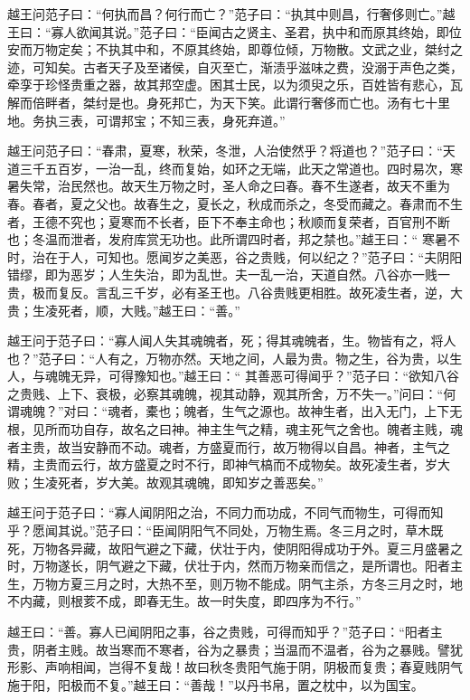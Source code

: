 \documentclass[12pt,UTF8]{ctexbook}
\begin{document}
越王问范子曰：“何执而昌？何行而亡？”范子曰：“执其中则昌，行奢侈则亡。”越王曰：“寡人欲闻其说。”范子曰：“臣闻古之贤主、圣君，执中和而原其终始，即位安而万物定矣；不执其中和，不原其终始，即尊位倾，万物散。文武之业，桀纣之迹，可知矣。古者天子及至诸侯，自灭至亡，渐渍乎滋味之费，没溺于声色之类，牵孪于珍怪贵重之器，故其邦空虚。困其士民，以为须臾之乐，百姓皆有悲心，瓦解而倍畔者，桀纣是也。身死邦亡，为天下笑。此谓行奢侈而亡也。汤有七十里地。务执三表，可谓邦宝；不知三表，身死弃道。”

越王问范子曰：“春肃，夏寒，秋荣，冬泄，人治使然乎？将道也？”范子曰：“天道三千五百岁，一治一乱，终而复始，如环之无端，此天之常道也。四时易次，寒暑失常，治民然也。故天生万物之时，圣人命之曰春。春不生遂者，故天不重为春。春者，夏之父也。故春生之，夏长之，秋成而杀之，冬受而藏之。春肃而不生者，王德不究也；夏寒而不长者，臣下不奉主命也；秋顺而复荣者，百官刑不断也；冬温而泄者，发府库赏无功也。此所谓四时者，邦之禁也。”越王曰：“ 寒暑不时，治在于人，可知也。愿闻岁之美恶，谷之贵贱，何以纪之？”范子曰：“夫阴阳错缪，即为恶岁；人生失治，即为乱世。夫一乱一治，天道自然。八谷亦一贱一贵，极而复反。言乱三千岁，必有圣王也。八谷贵贱更相胜。故死凌生者，逆，大贵；生凌死者，顺，大贱。”越王曰：“善。”

越王问于范子曰：“寡人闻人失其魂魄者，死；得其魂魄者，生。物皆有之，将人也？”范子曰：“人有之，万物亦然。天地之间，人最为贵。物之生，谷为贵，以生人，与魂魄无异，可得豫知也。”越王曰：“ 其善恶可得闻乎？”范子曰：“欲知八谷之贵贱、上下、衰极，必察其魂魄，视其动静，观其所舍，万不失一。”问曰：“何谓魂魄？”对曰：“魂者，橐也；魄者，生气之源也。故神生者，出入无门，上下无根，见所而功自存，故名之曰神。神主生气之精，魂主死气之舍也。魄者主贱，魂者主贵，故当安静而不动。魂者，方盛夏而行，故万物得以自昌。神者，主气之精，主贵而云行，故方盛夏之时不行，即神气槁而不成物矣。故死凌生者，岁大败；生凌死者，岁大美。故观其魂魄，即知岁之善恶矣。”

越王问于范子曰：“寡人闻阴阳之治，不同力而功成，不同气而物生，可得而知乎？愿闻其说。”范子曰：“臣闻阴阳气不同处，万物生焉。冬三月之时，草木既死，万物各异藏，故阳气避之下藏，伏壮于内，使阴阳得成功于外。夏三月盛暑之时，万物遂长，阴气避之下藏，伏壮于内，然而万物亲而信之，是所谓也。阳者主生，万物方夏三月之时，大热不至，则万物不能成。阴气主杀，方冬三月之时，地不内藏，则根荄不成，即春无生。故一时失度，即四序为不行。”

越王曰：“善。寡人已闻阴阳之事，谷之贵贱，可得而知乎？”范子曰：“阳者主贵，阴者主贱。故当寒而不寒者，谷为之暴贵；当温而不温者，谷为之暴贱。譬犹形影、声响相闻，岂得不复哉！故曰秋冬贵阳气施于阴，阴极而复贵；春夏贱阴气施于阳，阳极而不复。”越王曰：“善哉！”以丹书帛，置之枕中，以为国宝。
\end{document}

